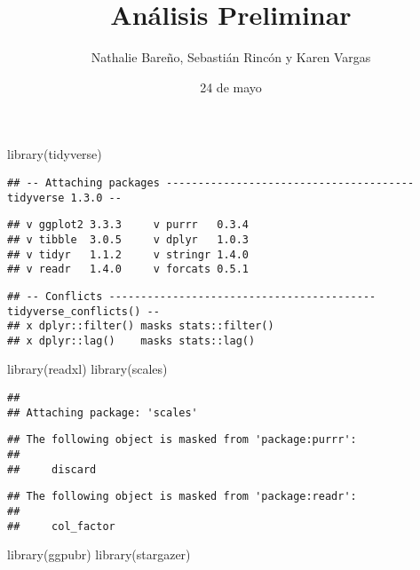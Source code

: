 \documentclass[
]{article}
\title{Análisis Preliminar}
\author{Nathalie Bareño, Sebastián Rincón y Karen Vargas}
\date{24 de mayo}
\newenvironment{Shaded}{\begin{snugshade}}{\end{snugshade}}
\newcommand{\FunctionTok}[1]{\textcolor[rgb]{0.00,0.00,0.00}{#1}}
\newcommand{\NormalTok}[1]{#1}
\begin{document}
\maketitle

\begin{Shaded}
\begin{Highlighting}[]
\FunctionTok{library}\NormalTok{(tidyverse)}
\end{Highlighting}
\end{Shaded}

\begin{verbatim}
## -- Attaching packages --------------------------------------- tidyverse 1.3.0 --
\end{verbatim}

\begin{verbatim}
## v ggplot2 3.3.3     v purrr   0.3.4
## v tibble  3.0.5     v dplyr   1.0.3
## v tidyr   1.1.2     v stringr 1.4.0
## v readr   1.4.0     v forcats 0.5.1
\end{verbatim}

\begin{verbatim}
## -- Conflicts ------------------------------------------ tidyverse_conflicts() --
## x dplyr::filter() masks stats::filter()
## x dplyr::lag()    masks stats::lag()
\end{verbatim}

\begin{Shaded}
\begin{Highlighting}[]
\FunctionTok{library}\NormalTok{(readxl)}
\FunctionTok{library}\NormalTok{(scales)}
\end{Highlighting}
\end{Shaded}

\begin{verbatim}
## 
## Attaching package: 'scales'
\end{verbatim}

\begin{verbatim}
## The following object is masked from 'package:purrr':
## 
##     discard
\end{verbatim}

\begin{verbatim}
## The following object is masked from 'package:readr':
## 
##     col_factor
\end{verbatim}

\begin{Shaded}
\begin{Highlighting}[]
\FunctionTok{library}\NormalTok{(ggpubr)}
\FunctionTok{library}\NormalTok{(stargazer)}
\end{Highlighting}
\end{Shaded}
\end{document}
